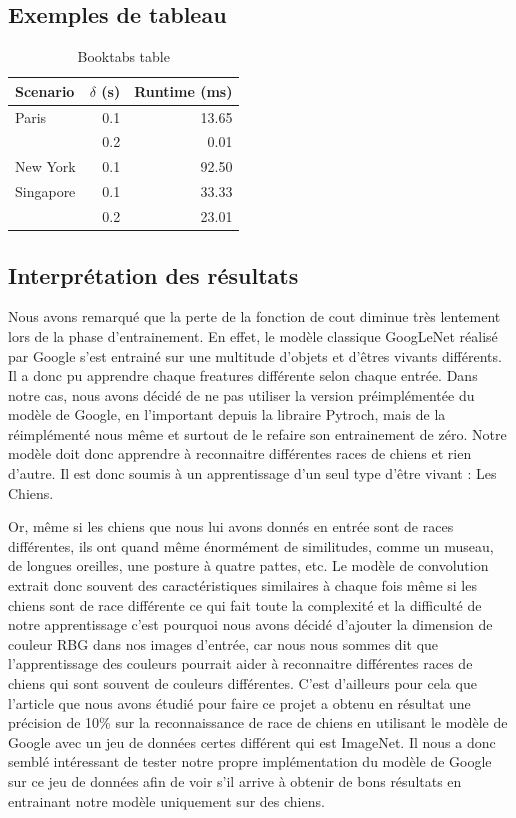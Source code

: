 \documentclass{article}
\begin{document}
\subsection{Exemples de tableau}

\begin{table}[htbp]
\centering
\begin{tabular}{lrr}  
\toprule
Scenario  & $\delta$ (s) & Runtime (ms) \\
\midrule
Paris       & 0.1  & 13.65      \\
            & 0.2  & 0.01       \\
New York    & 0.1  & 92.50      \\
Singapore   & 0.1  & 33.33      \\
            & 0.2  & 23.01      \\
\bottomrule
\end{tabular}
\caption{Booktabs table}
\label{tab:booktabs}
\end{table}

\subsection{Interprétation des résultats}
Nous avons remarqué que la perte de la fonction de cout diminue très lentement
lors de la phase d’entrainement. En effet, le modèle classique GoogLeNet réalisé
par Google s’est entrainé sur une multitude d’objets et d'êtres vivants
différents. Il a donc pu apprendre chaque freatures différente selon chaque
entrée. Dans notre cas, nous avons décidé de ne pas utiliser la version
préimplémentée du modèle de Google, en l’important depuis la libraire Pytroch,
mais de la réimplémenté nous même et surtout de le refaire son entrainement de
zéro. Notre modèle doit donc apprendre à reconnaitre différentes races de chiens
et rien d’autre. Il est donc soumis à un apprentissage d’un seul type d’être
vivant : Les Chiens.

Or, même si les chiens que nous lui avons donnés en entrée sont de races
différentes, ils ont quand même énormément de similitudes, comme un museau, de
longues oreilles, une posture à quatre pattes, etc. Le modèle de convolution
extrait donc souvent des caractéristiques similaires à chaque fois même si les
chiens sont de race différente ce qui fait toute la complexité et la difficulté
de notre apprentissage c’est pourquoi nous avons décidé d’ajouter la dimension
de couleur RBG dans nos images d’entrée, car nous nous sommes dit que
l’apprentissage des couleurs pourrait aider à reconnaitre différentes races de
chiens qui sont souvent de couleurs différentes. C’est d’ailleurs pour cela que
l’article que nous avons étudié pour faire ce projet a obtenu en résultat une
précision de 10\% sur la reconnaissance de race de chiens en utilisant le modèle
de Google avec un jeu de données certes différent qui est ImageNet. Il nous a
donc semblé intéressant de tester notre propre implémentation du modèle de
Google sur ce jeu de données afin de voir s'il arrive à obtenir de bons résultats
en entrainant notre modèle uniquement sur des chiens.
\end{document}
